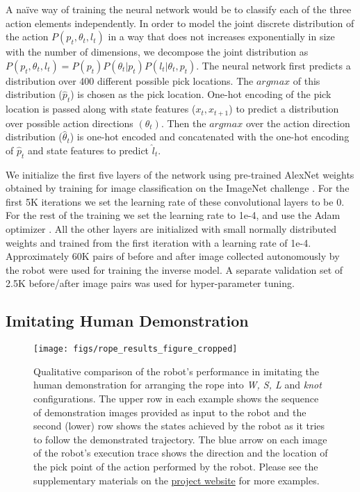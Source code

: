 \documentclass[letterpaper, 10 pt, conference]{ieeeconf}  %
\begin{document}
A na\"{i}ve way of training the neural network would be to classify each of the three action elements independently. In order to model the joint discrete distribution of the action $P(p_t, \theta_t, l_t)$ in a way that does not increases exponentially in size with the number of dimensions, we decompose the joint distribution as $P(p_t, \theta_t, l_t) = P(p_t)P(\theta_t|p_t)P(l_t|\theta_t, p_t)$. The neural network first predicts a distribution over 400 different possible pick locations. The $argmax$ of this distribution ($\hat{p}_t$) is chosen as the pick location. One-hot encoding of the pick location is passed along with state features ($x_t, x_{t+1}$) to predict a distribution over possible action directions $(\theta_t)$. Then the $argmax$ over the action direction distribution ($\hat{\theta}_t$) is one-hot encoded and concatenated with the one-hot encoding of $\hat{p}_t$ and state features to predict $\hat{l}_t$.


We initialize the first five layers of the network using pre-trained AlexNet weights obtained by training for image classification on the ImageNet challenge \cite{krizhevsky2012imagenet}. For the first 5K iterations we set the learning rate of these convolutional layers to be 0. For the rest of the training we set the learning rate to 1e-4, and use the Adam optimizer \cite{kingma2014adam}. All the other layers are initialized with small normally distributed weights and trained from the first iteration with a learning rate of 1e-4. Approximately 60K pairs of before and after image collected autonomously by the robot were used for training the inverse model. A separate validation set of 2.5K before/after image pairs was used for hyper-parameter tuning. 

\subsection{Imitating Human Demonstration}
\label{sec:imitation}

\begin{figure*}[t]
    \centering
    \texttt{[image: figs/rope\_results\_figure\_cropped]}
    \caption{Qualitative comparison of the robot's performance in imitating the human demonstration for arranging the rope into \textit{W, S, L} and \textit{knot} configurations. The upper row in each example shows the sequence of demonstration images provided as input to the robot and the second (lower) row shows the states achieved by the robot as it tries to follow the demonstrated trajectory. The blue arrow on each image of the robot's execution trace shows the direction and the location of the pick point of the action performed by the robot. Please see the supplementary materials on the \href{https://ropemanipulation.github.io/}{project website} for more examples.}%
    \label{fig:results}
\end{figure*}
\end{document}
